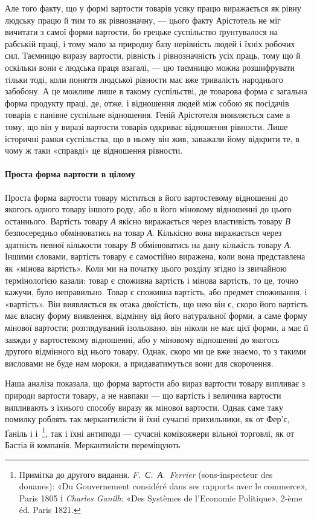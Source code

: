 
Але того факту, що у формі вартости товарів усяку працю виражається
як рівну людську працю й тим то як рівнозначну, —
цього факту Арістотель не міг вичитати з самої форми вартости,
бо грецьке суспільство ґрунтувалося на рабській праці, і тому
мало за природну базу нерівність людей і їхніх робочих сил.
Таємницю виразу вартости, рівність і рівнозначність усіх праць,
тому що й оскільки вони є людська праця взагалі, — цю таємницю
можна розшифрувати тільки тоді, коли поняття людської рівности
має вже тривалість народнього забобону. А це можливе лише в
такому суспільстві, де товарова форма є загальна форма продукту
праці, де, отже, і відношення людей між собою як посідачів товарів
є панівне суспільне відношення. Геній Арістотеля виявляється
саме в тому, що він у виразі вартости товарів одкриває відношення
рівности. Лише історичні рамки суспільства, що в ньому він жив,
заважали йому відкрити те, в чому ж таки «справді» це відношення
рівности.

\paragraph{Проста форма вартости в цілому}

Проста форма вартости товару міститься в його вартостевому
відношенні до якогось одного товару іншого роду, або в його міновому
відношенні до цього останнього. Вартість товару \emph{А} якісно
виражається через властивість товару \emph{В} безпосередньо обмінюватись
на товар \emph{А}. Кількісно вона виражається через здатність
певної кількости товару \emph{В} обмінюватись на дану кількість товару
\emph{А}. Іншими словами, вартість товару є самостійно виражена, коли
вона представлена як «мінова вартість». Коли ми на початку цього
розділу згідно із звичайною термінологією казали: товар є споживна
вартість і мінова вартість, то це, точно кажучи, було неправильно.
Товар є споживна вартість, або предмет споживання, і
«вартість». Він виявляється як отака двоїстість, що нею він є,
скоро його вартість має власну форму виявлення, відмінну від
його натуральної форми, а саме форму мінової вартости; розглядуваний
ізольовано, він ніколи не має цієї форми, а має її завжди
у вартостевому відношенні, або у міновому відношенні до якогось
другого відмінного від нього товару. Однак, скоро ми це вже
знаємо, то з такими висловами не буде нам мороки, а придаватимуться
вони для скорочення.

Наша аналіза показала, що форма вартости або вираз вартости
товару випливає з природи вартости товару, а не навпаки — що
вартість і величина вартости випливають з їхнього способу виразу
як мінової вартости. Однак саме таку помилку роблять так меркантилісти
й їхні сучасні прихильники, як от Фер’є, Ґаніль і
і~\footnote{
Примітка до другого видання. \emph{F.~С.~А.~Ferrier} (sous-inspecteur
des douanes): «Du Gouvernement considéré dans ses rapports avec
le commerce», Paris 1805 і \emph{Charles Ganilh}: «Des Systèmes de l’Economie
Politique», 2-ème éd. Paris 1821.
}, так і їхні антиподи — сучасні комівояжери вільної торговлі,
як от Бастіа й компанія. Меркантилісти переміщують
\parbreak{}  %
